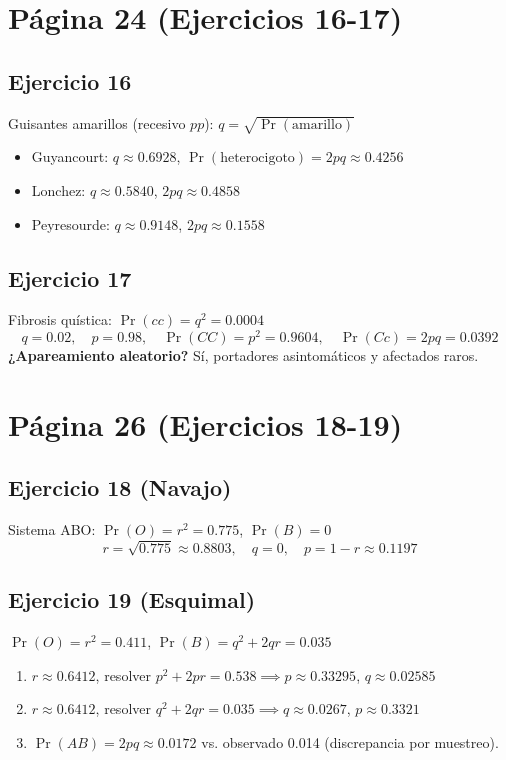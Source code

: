 \documentclass{article}
\begin{document}
	\section*{Página 24 (Ejercicios 16-17)}
	
	\subsection*{Ejercicio 16}
	Guisantes amarillos (recesivo \( pp \)): \( q = \sqrt{\Pr(\text{amarillo})} \)
	\begin{itemize}
		\item Guyancourt: \( q \approx 0.6928 \), \( \Pr(\text{heterocigoto}) = 2pq \approx 0.4256 \)
		\item Lonchez: \( q \approx 0.5840 \), \( 2pq \approx 0.4858 \)
		\item Peyresourde: \( q \approx 0.9148 \), \( 2pq \approx 0.1558 \)
	\end{itemize}
	
	\subsection*{Ejercicio 17}
	Fibrosis quística: \( \Pr(cc) = q^2 = 0.0004 \)
	\[
	q = 0.02, \quad p = 0.98, \quad \Pr(CC) = p^2 = 0.9604, \quad \Pr(Cc) = 2pq = 0.0392
	\]
	\textbf{¿Apareamiento aleatorio?} Sí, portadores asintomáticos y afectados raros.
	
	\section*{Página 26 (Ejercicios 18-19)}
	
	\subsection*{Ejercicio 18 (Navajo)}
	Sistema ABO: \( \Pr(O) = r^2 = 0.775 \), \( \Pr(B) = 0 \)
	\[
	r = \sqrt{0.775} \approx 0.8803, \quad q = 0, \quad p = 1 - r \approx 0.1197
	\]
	
	\subsection*{Ejercicio 19 (Esquimal)}
	\( \Pr(O) = r^2 = 0.411 \), \( \Pr(B) = q^2 + 2qr = 0.035 \)
	\begin{enumerate}[label=\alph*)]
		\item \( r \approx 0.6412 \), resolver \( p^2 + 2pr = 0.538 \implies p \approx 0.33295 \), \( q \approx 0.02585 \)
		\item \( r \approx 0.6412 \), resolver \( q^2 + 2qr = 0.035 \implies q \approx 0.0267 \), \( p \approx 0.3321 \)
		\item \( \Pr(AB) = 2pq \approx 0.0172 \) vs. observado 0.014 (discrepancia por muestreo).
	\end{enumerate}
	
\end{document}
